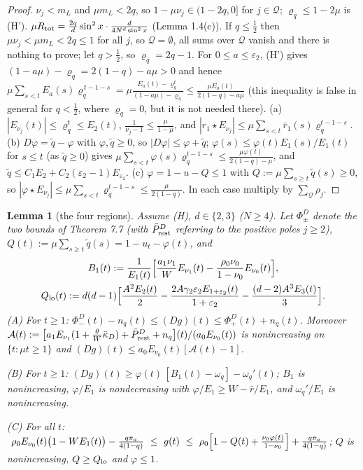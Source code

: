\documentclass[11pt,a4paper]{article}
\newtheorem{lemma}[theorem]{Lemma}
\theoremstyle{definition}
\theoremstyle{remark}
\begin{document}
\begin{proof}
$\nu_j<m_L$ and $\mu m_L<2q$, so $1-\mu\nu_j\in(1-2q,0]$ for $j\in\mathcal Q$; $\varrho_q\le1-2\mu$ is (H'). $\mu R_{\rm tot}=\frac{2q}{d}\sin^2x\cdot\frac{d}{4N^d\sin^2x}$ (Lemma 1.4(c)). If $q\le\frac12$ then $\mu\nu_j<\mu m_L<2q\le1$ for all $j$, so $\mathcal Q=\emptyset$, all sums over $\mathcal Q$ vanish and there is nothing to prove; let $q>\frac12$, so $\varrho_q=2q-1$. For $0\le a\le\varepsilon_2$, (H') gives $(1-a\mu)-\varrho_q=2(1-q)-a\mu>0$ and hence $\mu\sum_{s<t}E_a(s)\varrho_q^{\,t-1-s}=\mu\frac{E_a(t)-\varrho_q^t}{(1-a\mu)-\varrho_q}\le\frac{\mu E_a(t)}{2(1-q)-a\mu}$ (this inequality is false in general for $q<\frac12$, where $\varrho_q=0$, but it is not needed there). (a) $|E_{\nu_j}(t)|\le\varrho_q^t\le E_2(t)$, $\frac{1}{\nu_j-1}\le\frac{\mu}{1-\mu}$, and $|r_1\star E_{\nu_j}|\le\mu\sum_{s<t}\bar r_1(s)\varrho_q^{t-1-s}$. (b) $D\varphi=\tilde q-\varphi$ with $\varphi,\tilde q\ge0$, so $|D\varphi|\le\varphi+\tilde q$; $\varphi(s)\le\varphi(t)E_1(s)/E_1(t)$ for $s\le t$ (as $\tilde q\ge0$) gives $\mu\sum_{s<t}\varphi(s)\varrho_q^{t-1-s}\le\frac{\mu\varphi(t)}{2(1-q)-\mu}$, and $\tilde q\le C_1E_2+C_2(\varepsilon_2-1)E_{\varepsilon_2}$. (c) $\varphi=1-u-Q\le1$ with $Q:=\mu\sum_{s\ge t}\tilde q(s)\ge0$, so $|\varphi\star E_{\nu_j}|\le\mu\sum_{s<t}\varrho_q^{t-1-s}\le\frac{\mu}{2(1-q)}$. In each case multiply by $\sum_{\mathcal Q}\rho_j$.
\end{proof}

\begin{lemma}[{the four regions}]
Assume (H), $d\in\{2,3\}$ ($N\ge4$). Let $\Phi_\pm^D$ denote the two bounds of Theorem 7.7 (with $\bar P^D_{\rm rest}$ referring to the positive poles $j\ge2$), $Q(t):=\mu\sum_{s\ge t}\tilde q(s)=1-u_t-\varphi(t)$, and
\begin{gather*}
B_1(t):=\frac{1}{E_1(t)}\Bigl[\frac{a_1\nu_1}{W}E_{\nu_1}(t)-\frac{\rho_0\nu_0}{1-\nu_0}E_{\nu_0}(t)\Bigr], \\
Q_{\rm lo}(t):=d(d-1)\Bigl[\frac{A^2E_2(t)}{2}-\frac{2A\gamma_2\varepsilon_2E_{1+\varepsilon_2}(t)}{1+\varepsilon_2}-\frac{(d-2)A^3E_3(t)}{3}\Bigr].
\end{gather*}
(A) For $t\ge1$: $\Phi_-^D(t)-n_q(t)\le(Dg)(t)\le\Phi_+^D(t)+n_q(t)$. Moreover $\mathcal A(t):=\bigl[a_1E_{\nu_1}(1+\frac\theta W\bar\kappa_D)+\bar P^D_{\rm rest}+n_q\bigr](t)/(a_0E_{\nu_0}(t))$ is nonincreasing on $\{t:\mu t\ge1\}$ and $(Dg)(t)\le a_0E_{\nu_0}(t)[\mathcal A(t)-1]$.

(B) For $t\ge1$: $(Dg)(t)\ge\varphi(t)\,[B_1(t)-\omega_q]-\omega_q'(t)$; $B_1$ is nonincreasing, $\varphi/E_1$ is nondecreasing with $\varphi/E_1\ge W-\bar r/E_1$, and $\omega_q'/E_1$ is nonincreasing.

(C) For all $t$: $\ \rho_0E_{\nu_0}(t)\bigl(1-WE_1(t)\bigr)-\frac{q\pi_a}{4(1-q)}\ \le\ g(t)\ \le\ \rho_0\Bigl[1-Q(t)+\frac{\nu_0\varphi(t)}{1-\nu_0}\Bigr]+\frac{q\pi_a}{4(1-q)}$; $Q$ is nonincreasing, $Q\ge Q_{\rm lo}$ and $\varphi\le1$.
\end{lemma}
\end{document}
